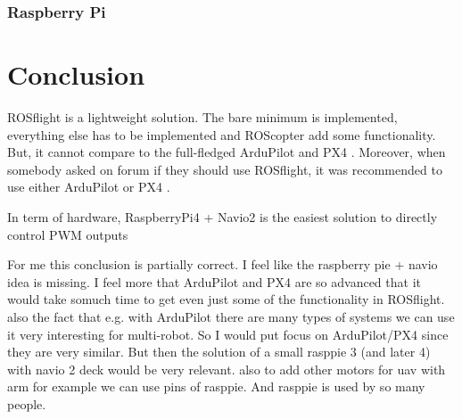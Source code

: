 \subsubsection{Raspberry Pi}

\section{Conclusion}
ROSflight is a lightweight solution. The bare minimum is implemented, everything else has to be implemented and ROScopter add some functionality. But, it cannot compare to the full-fledged ArduPilot and PX4 \cite{reddit_firmware_ros}. Moreover, when somebody asked on forum if they should use ROSflight, it was recommended to use either ArduPilot or PX4 \cite{reddit_swarm_ros}.

In term of hardware, RaspberryPi4 + Navio2 is the easiest solution to directly control PWM outputs

    {\color{red}For me this conclusion is partially correct. I feel like the raspberry pie + navio idea is missing. }
    {\color{red}I feel more that ArduPilot and PX4 are so advanced that it would take somuch time to get even just some of the functionality in ROSflight. also the fact that e.g. with ArduPilot there are many types of systems we can use it very interesting for multi-robot. So I would put focus on ArduPilot/PX4 since they are very similar. But then the solution of a small rasppie 3 (and later 4) with navio 2 deck would be very relevant. also to add other motors for uav with arm for example we can use pins of rasppie. And rasppie is used by so many people.}
